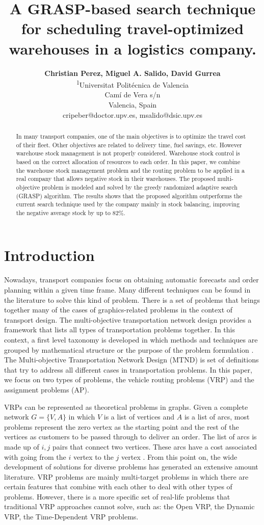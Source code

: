 \documentclass[letterpaper]{article} %
\title{A GRASP-based search technique for scheduling travel-optimized warehouses in a logistics company.}
\author{\Large \textbf{Christian Perez, Miguel A. Salido, David Gurrea}\\ %
\textsuperscript{\rm 1}Universitat Politécnica de Valencia\\
Camí de Vera s/n\\
Valencia, Spain\\
cripeber@doctor.upv.es, msalido@dsic.upv.es %
}
\begin{document}
\maketitle


\begin{abstract}
    In many transport companies, one of the main objectives is to optimize the travel cost of their fleet. Other objectives are related to delivery time, fuel savings, etc. However warehouse stock management is not properly considered. Warehouse stock control is based on the correct allocation of resources to each order. In this paper, we combine the warehouse stock management problem and the routing problem to be applied in a real company that allows negative stock in their warehouses. The proposed multi-objective problem is modeled and solved by the greedy randomized adaptive search (GRASP) algorithm. The results shows that the proposed algorithm outperforms the current search technique used by the company mainly in stock balancing, improving the negative average stock by up to 82\%.

\end{abstract}
\section*{Introduction}
Nowadays, transport companies focus on obtaining automatic forecasts and order planning within a given time frame. Many different techniques can be found in the literature to solve this kind of problem. There is a set of problems that brings together many of the cases of graphics-related problems in the context of transport design. The multi-objective transportation network design provides a framework that lists all types of transportation problems together. In this context, a first level taxonomy is developed in which methods and techniques are grouped by mathematical structure or the purpose of the problem formulation \cite{Current1993}.
The Multi-objective Transportation Network Design (MTND) is set of definitions that try to address all different cases in transportation problems. In this paper, we focus on two types of problems, the vehicle routing problems (VRP) and the assignment problems (AP).

VRPs can be represented as theoretical problems in graphs. Given a complete network $G = \{ V,A \}$ in which $V$ is a list of vertices and $A$ is a list of arcs, most problems represent the zero vertex as the starting point and the rest of the vertices as customers to be passed through to deliver an order. The list of arcs is made up of $i,j$ pairs that connect two vertices. These arcs have a cost associated with going from the $i$ vertex to the $j$ vertex \cite{Eksioglu2009}. From this point on, the wide development of solutions for diverse problems has generated an extensive amount literature. VRP problems are mainly multi-target problems in which there are certain features that combine with each other to deal with other types of problems. However, there is a more specific set of real-life problems that traditional VRP approaches cannot solve, such as: the Open VRP, the Dynamic VRP, the Time-Dependent VRP problems.
\end{document}
